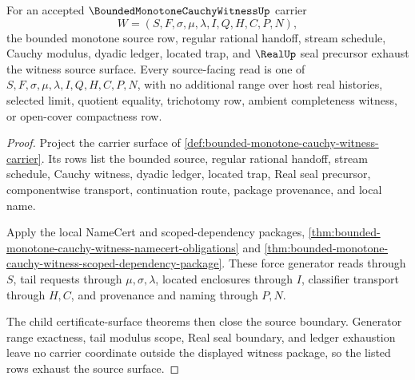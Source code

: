 \begin{theorem}
\label{thm:bounded-monotone-cauchy-witness-source-row-exhaustion}
For an accepted $\BoundedMonotoneCauchyWitnessUp$ carrier
$$
W=(S,F,\sigma,\mu,\lambda,I,Q,H,C,P,N),
$$
the bounded monotone source row, regular rational handoff, stream schedule, Cauchy modulus, dyadic ledger, located trap, and $\RealUp$ seal precursor exhaust the witness source surface. Every source-facing read is one of $S,F,\sigma,\mu,\lambda,I,Q,H,C,P,N$, with no additional range over host real histories, selected limit, quotient equality, trichotomy row, ambient completeness witness, or open-cover compactness row.
\end{theorem}
\begin{proof}
Project the carrier surface of \autoref{def:bounded-monotone-cauchy-witness-carrier}. Its rows list the bounded source, regular rational handoff, stream schedule, Cauchy witness, dyadic ledger, located trap, Real seal precursor, componentwise transport, continuation route, package provenance, and local name.

Apply the local NameCert and scoped-dependency packages, \autoref{thm:bounded-monotone-cauchy-witness-namecert-obligations} and \autoref{thm:bounded-monotone-cauchy-witness-scoped-dependency-package}. These force generator reads through $S$, tail requests through $\mu,\sigma,\lambda$, located enclosures through $I$, classifier transport through $H,C$, and provenance and naming through $P,N$.

The child certificate-surface theorems then close the source boundary. Generator range exactness, tail modulus scope, Real seal boundary, and ledger exhaustion leave no carrier coordinate outside the displayed witness package, so the listed rows exhaust the source surface.
\end{proof}

